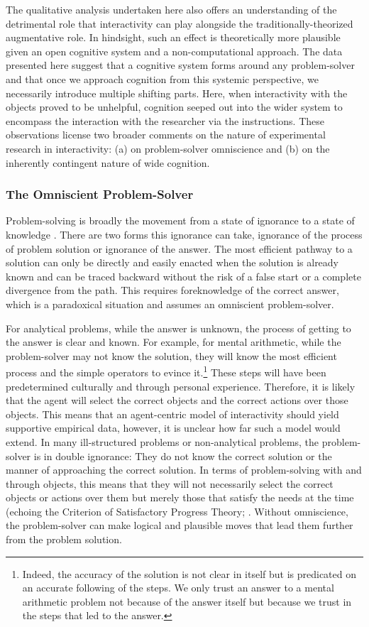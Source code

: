\documentclass{article}
\begin{document}
The qualitative analysis undertaken here also offers an understanding of the detrimental role that interactivity can play alongside the traditionally-theorized augmentative role. In hindsight, such an effect is theoretically more plausible given an open cognitive system and a non-computational approach. The data presented here suggest that a cognitive system forms around any problem-solver and that once we approach cognition from this systemic perspective, we necessarily introduce multiple shifting parts. Here, when interactivity with the objects proved to be unhelpful, cognition seeped out into the wider system to encompass the interaction with the researcher via the instructions. These observations license two broader comments on the nature of experimental research in interactivity: (a) on problem-solver omniscience and (b) on the inherently contingent nature of wide cognition.

\subsubsection{The Omniscient Problem-Solver}

Problem-solving is broadly the movement from a state of ignorance to a state of knowledge \parencite{Arfini2019}. There are two forms this ignorance can take, ignorance of the process of problem solution or ignorance of the answer. The most efficient pathway to a solution can only be directly and easily enacted when the solution is already known and can be traced backward without the risk of a false start or a complete divergence from the path. This requires foreknowledge of the correct answer, which is a paradoxical situation and assumes an omniscient problem-solver.

For analytical problems, while the answer is unknown, the process of getting to the answer is clear and known. For example, for mental arithmetic, while the problem-solver may not know the solution, they will know the most efficient process and the simple operators to evince it.\footnote{Indeed, the accuracy of the solution is not clear in itself but is predicated on an accurate following of the steps. We only trust an answer to a mental arithmetic problem not because of the answer itself but because we trust in the steps that led to the answer.} These steps will have been predetermined culturally and through personal experience. Therefore, it is likely that the agent will select the correct objects and the correct actions over those objects. This means that an agent-centric model of interactivity should yield supportive empirical data, however, it is unclear how far such a model would extend. In many ill-structured problems or non-analytical problems, the problem-solver is in double ignorance: They do not know the correct solution or the manner of approaching the correct solution. In terms of problem-solving with and through objects, this means that they will not necessarily select the correct objects or actions over them but merely those that satisfy the needs at the time (echoing the Criterion of Satisfactory Progress Theory; \parencite{MacGregor2001, Ormerod2013}. Without omniscience, the problem-solver can make logical and plausible moves that lead them further from the problem solution. 
\end{document}
